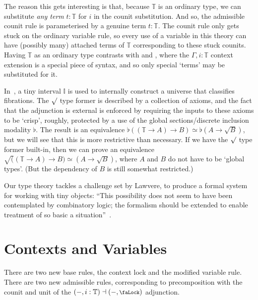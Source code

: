 \documentclass[10pt]{article}
\theoremstyle{definition}
\renewcommand{\equiv}{\simeq}
\newcommand{\lock}{\mathchoice
{\scalebox{0.8}{\text{\faLock}}}
{\scalebox{0.8}{\text{\faLock}}}
{\scalebox{0.5}{\text{\faLock}}}
{\scalebox{0.4}{\text{\faLock}}}
}
\newcommand{\Tiny}{\mathbb{T}}
\newcommand{\rformu}[1]{\surd #1}
\begin{document}
The reason this gets interesting is that, because $\Tiny$ is an ordinary type, we can substitute \emph{any term} $t : \Tiny$ for $i$ in the counit substitution. And so, the admissible counit rule is parameterised by a genuine term $t : \Tiny$. The counit rule only gets stuck on the ordinary variable rule, so every use of a variable in this theory can have (possibly many) attached terms of $\Tiny$ corresponding to these stuck counits. Having $\Tiny$ as an ordinary type contrasts with \cite{cavallo-harper:parametricity-for-ctt,cavallo:thesis} and \cite[Section 5]{fitchtt}, where the $\Gamma,i:\Tiny$ context extension is a special piece of syntax, and so only special `terms' may be substituted for it.

In~\cite{lops}, a tiny interval $\mathbb{I}$ is used to internally construct a universe that classifies fibrations. The $\rformu$ type former is described by a collection of axioms, and the fact that the adjunction is external is enforced by requiring the inputs to these axioms to be `crisp', roughly, protected by a use of the global sections/discrete inclusion modality $\flat$. The result is an equivalence $\flat((\Tiny \to A) \to B) \equiv \flat(A \to \rformu B)$, but we will see that this is more restrictive than necessary. If we have the $\rformu$ type former built-in, then we can prove an equivalence $\rformu ((\Tiny \to A) \to B) \equiv (A \to \rformu B)$, where $A$ and $B$ do not have to be `global types'. (But the dependency of $B$ is still somewhat restricted.)

Our type theory tackles a challenge set by Lawvere, to produce a formal system for working with tiny objects: ``This possibility does not seem to have been contemplated by combinatory logic; the formalism should be extended to enable treatment of so basic a situation''~\cite[Section 3]{lawvere:adjoints}.


\section{Contexts and Variables}

There are two new base rules, the context lock and the modified variable rule. There are two new admissible rules, corresponding to precomposition with the counit and unit of the $(-,i:\Tiny) \dashv (-,\lock)$ adjunction.
\end{document}
